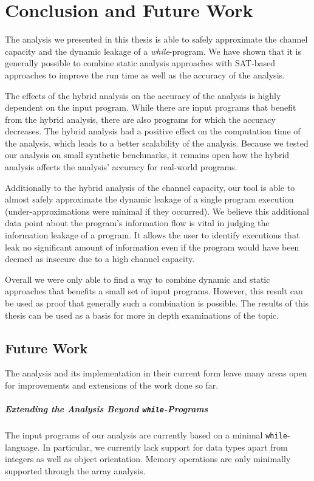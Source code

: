 \chapter{Conclusion and Future Work}\label{sec:conclusion}

The analysis we presented in this thesis is able to safely approximate the channel capacity and the dynamic leakage of a \emph{while}-program. We have shown that it is generally possible to combine static analysis approaches with SAT-based approaches to improve the run time as well as the accuracy of the analysis.

The effects of the hybrid analysis on the accuracy of the analysis is highly dependent on the input program. While there are input programs that benefit from the hybrid analysis, there are also programs for which the accuracy decreases. The hybrid analysis had a positive effect on the computation time of the analysis, which leads to a better scalability of the analysis. Because we tested our analysis on small synthetic benchmarks, it remains open how the hybrid analysis affects the analysis' accuracy for real-world programs.

Additionally to the hybrid analysis of the channel capacity, our tool is able to almost safely approximate the dynamic leakage of a single program execution (under-approximations were minimal if they occurred). We believe this additional data point about the program's information flow is vital in judging the information leakage of a program. It allows the user to identify executions that leak no significant amount of information even if the program would have been deemed as insecure due to a high channel capacity.

Overall we were only able to find a way to combine dynamic and static approaches that benefits a small set of input programs. However, this result can be used as proof that generally such a combination is possible. The results of this thesis can be used as a basis for more in depth examinations of the topic.

\section{Future Work}
The analysis and its implementation in their current form leave many areas open for improvements and extensions of the work done so far.

\paragraph{Extending the Analysis Beyond \texttt{while}-Programs}
The input programs of our analysis are currently based on a minimal \texttt{while}-language. In particular, we currently lack support for data types apart from integers as well as object orientation. Memory operations are only minimally supported through the array analysis.

